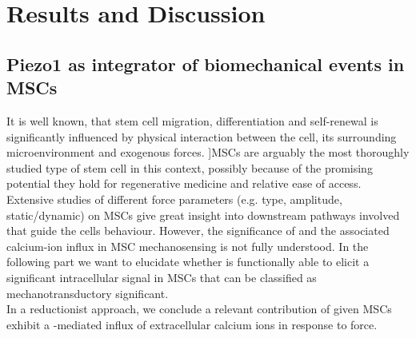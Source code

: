 \chapter{Results and Discussion}

\section{Piezo1 as integrator of biomechanical events in MSCs}
\label{sec:piezo1-as-integrator-of-biomechanical-events-in-mscs}

It is well known, that stem cell migration, differentiation and self-renewal is significantly influenced by physical interaction between the cell, its surrounding microenvironment and exogenous forces. \cite{Eyckmans2011, Lee2011}]MSCs are arguably the most thoroughly studied type of stem cell in this context, possibly because of the promising potential they hold for regenerative medicine and relative ease of access. Extensive studies of different force parameters (e.g. type, amplitude, static/dynamic) on MSCs give great insight into downstream pathways involved that guide the cells behaviour. However, the significance of \Piezo{} and the associated calcium-ion influx in MSC mechanosensing is not fully understood. In the following part we want to elucidate whether \Piezo{} is functionally able to elicit a significant intracellular signal in MSCs that can be classified as mechanotransductory significant.\\
In a reductionist approach, we conclude a relevant contribution of \Piezo{} given MSCs exhibit a \Piezo{}-mediated influx of extracellular calcium ions in response to force. \\
